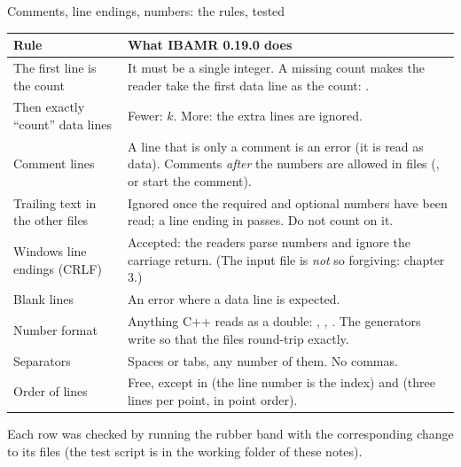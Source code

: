 \documentclass[aspectratio=169,11pt]{beamer}
\begin{document}
\begin{frame}{Comments, line endings, numbers: the rules, tested}
\scriptsize
\begin{tabular}{@{}L{0.32\textwidth}L{0.6\textwidth}@{}}
\toprule
Rule & What IBAMR 0.19.0 does\\
\midrule
The first line is the count & It must be a single integer. A missing count makes the reader take the first data line as the count: .\\
Then exactly ``count'' data lines & Fewer:  $k$. More: the extra lines are ignored.\\
Comment lines & A line that is only a comment is an error (it is read as data). Comments \emph{after} the numbers are allowed in  files (\code{\#}, \code{\%} or \code{!} start the comment).\\
Trailing text in the other files & Ignored once the required and optional numbers have been read; a  line ending in  passes. Do not count on it.\\
Windows line endings (CRLF) & Accepted: the readers parse numbers and ignore the carriage return. (The input file is \emph{not} so forgiving: chapter 3.)\\
Blank lines & An error where a data line is expected.\\
Number format & Anything C++ reads as a double: , , . The generators write  so that the files round-trip exactly.\\
Separators & Spaces or tabs, any number of them. No commas.\\
Order of lines & Free, except in  (the line number is the index) and  (three lines per point, in point order).\\
\bottomrule
\end{tabular}
\vspace{1mm}
\small Each row was checked by running the rubber band with the corresponding change to its files (the test script is in the working folder of these notes).
\end{frame}
\end{document}
